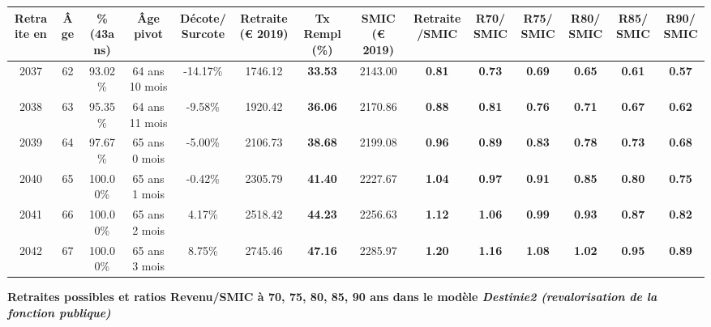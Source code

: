 \begin{adjustbox}{max width=\textwidth} 
\begin{tabular}[htb]{|c|c||c|c|c||c|c||c|c||c|c|c|c|c|} 
\hline 
 Retraite en &  Âge &  \%(43ans) &  Âge pivot &  Décote/Surcote &  Retraite (\euro{} 2019) &  Tx Rempl(\%) &  SMIC (\euro{} 2019) &  Retraite/SMIC &  R70/SMIC &  R75/SMIC &  R80/SMIC &  R85/SMIC &  R90/SMIC \\ 
\hline \hline 
 2037 &  62 &  93.02\% &  64 ans 10 mois &  -14.17\% &  1746.12 &  {\bf 33.53} &  2143.00 &  {\bf {\color{red} 0.81}} &  {\bf {\color{red} 0.73}} &  {\bf {\color{red} 0.69}} &  {\bf {\color{red} 0.65}} &  {\bf {\color{red} 0.61}} &  {\bf {\color{red} 0.57}} \\ 
\hline 
 2038 &  63 &  95.35\% &  64 ans 11 mois &  -9.58\% &  1920.42 &  {\bf 36.06} &  2170.86 &  {\bf {\color{red} 0.88}} &  {\bf {\color{red} 0.81}} &  {\bf {\color{red} 0.76}} &  {\bf {\color{red} 0.71}} &  {\bf {\color{red} 0.67}} &  {\bf {\color{red} 0.62}} \\ 
\hline 
 2039 &  64 &  97.67\% &  65 ans 0 mois &  -5.00\% &  2106.73 &  {\bf 38.68} &  2199.08 &  {\bf {\color{red} 0.96}} &  {\bf {\color{red} 0.89}} &  {\bf {\color{red} 0.83}} &  {\bf {\color{red} 0.78}} &  {\bf {\color{red} 0.73}} &  {\bf {\color{red} 0.68}} \\ 
\hline 
 2040 &  65 &  100.00\% &  65 ans 1 mois &  -0.42\% &  2305.79 &  {\bf 41.40} &  2227.67 &  {\bf 1.04} &  {\bf {\color{red} 0.97}} &  {\bf {\color{red} 0.91}} &  {\bf {\color{red} 0.85}} &  {\bf {\color{red} 0.80}} &  {\bf {\color{red} 0.75}} \\ 
\hline 
 2041 &  66 &  100.00\% &  65 ans 2 mois &  4.17\% &  2518.42 &  {\bf 44.23} &  2256.63 &  {\bf 1.12} &  {\bf 1.06} &  {\bf {\color{red} 0.99}} &  {\bf {\color{red} 0.93}} &  {\bf {\color{red} 0.87}} &  {\bf {\color{red} 0.82}} \\ 
\hline 
 2042 &  67 &  100.00\% &  65 ans 3 mois &  8.75\% &  2745.46 &  {\bf 47.16} &  2285.97 &  {\bf 1.20} &  {\bf 1.16} &  {\bf 1.08} &  {\bf 1.02} &  {\bf {\color{red} 0.95}} &  {\bf {\color{red} 0.89}} \\ 
\hline 
\hline 
\end{tabular} 
\end{adjustbox} 
 
 \vspace{0.1cm} 
{\bf \noindent Retraites possibles et ratios Revenu/SMIC à 70, 75, 80, 85, 90 ans dans le modèle \emph{Destinie2 (revalorisation de la fonction publique)}}  
 
